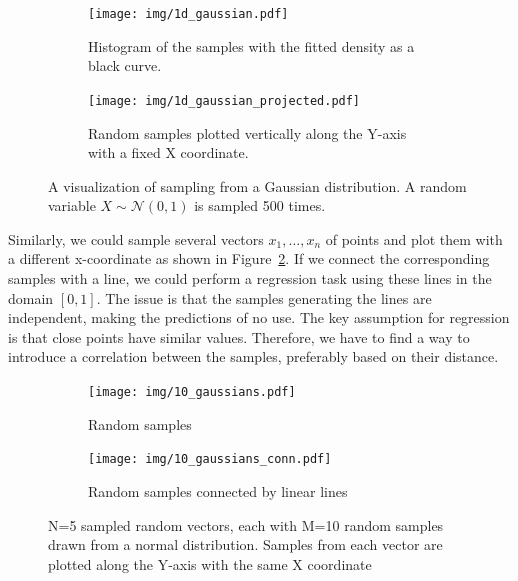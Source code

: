 \begin{figure}
    \centering
    \begin{subfigure}{0.49\textwidth}
        \centering
        \texttt{[image: img/1d\_gaussian.pdf]}
        \caption{Histogram of the samples with the fitted density as a black curve.}
    \end{subfigure}
    \hfill
    \begin{subfigure}{0.49\textwidth}
        \centering
        \texttt{[image: img/1d\_gaussian\_projected.pdf]}
        \caption{Random samples plotted vertically along the Y-axis with a fixed X coordinate.}
    \end{subfigure}
    \caption{A visualization of sampling from a Gaussian distribution. A random variable $X \sim \mathcal{N}(0, 1)$ is sampled 500 times.}
    \label{fig:1}
\end{figure}

Similarly, we could sample several vectors $x_1,\ldots,x_n$ of points and plot them with a different x-coordinate as shown in Figure~\ref{fig:2}. If we connect the corresponding samples with a line, we could perform a regression task using these lines in the domain $[0,1]$. The issue is that the samples generating the lines are independent, making the predictions of no use. The key assumption for regression is that close points have similar values. Therefore, we have to find a way to introduce a correlation between the samples, preferably based on their distance.

\begin{figure}
    \centering
    \begin{subfigure}{0.49\textwidth}
        \centering
        \texttt{[image: img/10\_gaussians.pdf]}
        \caption{Random samples}
    \end{subfigure}
    \hfill
    \begin{subfigure}{0.49\textwidth}
        \centering
        \texttt{[image: img/10\_gaussians\_conn.pdf]}
        \caption{Random samples connected by linear lines}
    \end{subfigure}
    \caption{N=5 sampled random vectors, each with M=10 random samples drawn from a normal distribution. Samples from each vector are plotted along the Y-axis with the same X coordinate}
    \label{fig:2}
\end{figure}

